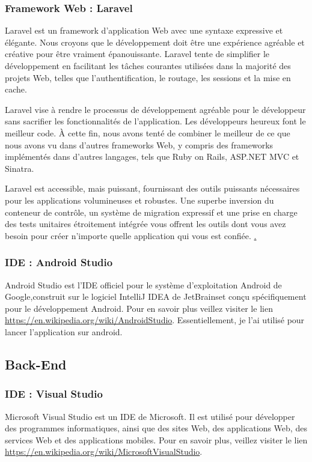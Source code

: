 \documentclass[a4paper, 12pt]{report}
\begin{document}
\subsubsection{Framework Web :  Laravel}
\label{Laravel}
Laravel est un framework d'application Web avec une syntaxe expressive et élégante. Nous croyons que le développement doit être une expérience agréable et créative pour être vraiment épanouissante. Laravel tente de simplifier le développement en facilitant les tâches courantes utilisées dans la majorité des projets Web, telles que l'authentification, le routage, les sessions et la mise en cache.

Laravel vise à rendre le processus de développement agréable pour le développeur sans sacrifier les fonctionnalités de l'application. Les développeurs heureux font le meilleur code. À cette fin, nous avons tenté de combiner le meilleur de ce que nous avons vu dans d'autres frameworks Web, y compris des frameworks implémentés dans d'autres langages, tels que Ruby on Rails, ASP.NET MVC et Sinatra.

Laravel est accessible, mais puissant, fournissant des outils puissants nécessaires pour les applications volumineuses et robustes. Une superbe inversion du conteneur de contrôle, un système de migration expressif et une prise en charge des tests unitaires étroitement intégrée vous offrent les outils dont vous avez besoin pour créer n'importe quelle application qui vous est confiée.
\href{https://laravel.com/docs/4.2/introduction#laravel-philosophy}.
\subsubsection{IDE : Android Studio}
Android Studio est l’IDE officiel pour le système d’exploitation Android de Google,construit sur le logiciel IntelliJ IDEA de JetBrainset conçu spécifiquement pour le développement Android. Pour en savoir plus veillez visiter le lien \newline \href{https://en.wikipedia.org/wiki/Android_Studio}{https://en.wikipedia.org/wiki/AndroidStudio}. \newline
Essentiellement, je l'ai utilisé pour lancer l'application sur android.
\subsection{Back-End}
\subsubsection{IDE : Visual Studio}
Microsoft Visual Studio est un IDE de Microsoft. Il est utilisé pour développer des programmes informatiques, ainsi que des sites Web, des applications Web, des services Web et des applications mobiles. Pour en savoir plus, veillez visiter le lien \href{https://en.wikipedia.org/wiki/Microsoft_Visual_Studio}{https://en.wikipedia.org/wiki/MicrosoftVisualStudio}.
\end{document}
